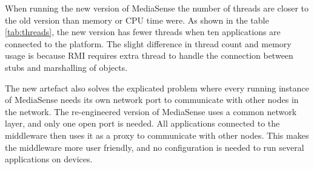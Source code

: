 When running the new version of MediaSense the number of threads are closer to the old version than memory or CPU time were. As shown in the table \ref{tab:threads}, the new version has fewer threads when ten applications are connected to the platform. The slight difference in thread count and memory usage is because RMI requires extra thread to handle the connection between stubs and marshalling of objects. 

The new artefact also solves the explicated problem where every running instance of MediaSense needs its own network port to communicate with other nodes in the network. The re-engineered version of MediaSense uses a common network layer, and only one open port is needed. All applications connected to the middleware then uses it as a proxy to communicate with other nodes. This makes the middleware more user friendly, and no configuration is needed to run several applications on devices. 
